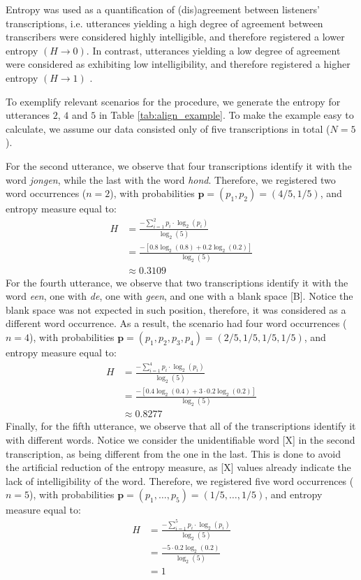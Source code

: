 Entropy was used as a quantification of (dis)agreement between listeners' transcriptions, i.e. utterances yielding a high degree of agreement between transcribers were considered highly intelligible, and therefore registered a lower entropy $\left( H \rightarrow 0 \right)$. In contrast, utterances yielding a low degree of agreement were considered as exhibiting low intelligibility, and therefore registered a higher entropy $\left( H \rightarrow 1 \right)$ \citep{Boonen_et_al_2021, Faes_et_al_2021}. 

To exemplify relevant scenarios for the procedure, we generate the entropy for utterances $2$, $4$ and $5$ in Table \ref{tab:align_example}. To make the example easy to calculate, we assume our data consisted only of five transcriptions in total ($N=5$).

For the second utterance, we observe that four transcriptions identify it with the word \textit{jongen}, while the last with the word \textit{hond}. Therefore, we registered two word occurrences ($n=2$), with probabilities $\pmb{p} = (p_{1}, p_{2}) = (4/5, 1/5)$, and entropy measure equal to:
%
\begin{align*}
	H &= \frac{-\sum_{i=1}^{2} p_{i} \cdot \log_{2}(p_{i})}{\log_{2}(5)} \\
	&= \frac{- \left[ 0.8 \log_{2}(0.8) + 0.2 \log_{2}(0.2) \right] }{\log_{2}(5)} \\
	&\approx 0.3109
\end{align*} 
%
For the fourth utterance, we observe that two transcriptions identify it with the word \textit{een}, one with \textit{de}, one with \textit{geen}, and one with a blank space [B]. Notice the blank space was not expected in such position, therefore, it was considered as a different word occurrence. As a result, the scenario had four word occurrences ($n=4$), with probabilities $\pmb{p} = (p_{1}, p_{2}, p_{3}, p_{4}) = (2/5, 1/5, 1/5, 1/5)$, and entropy measure equal to:
%
\begin{align*}
	H &= \frac{-\sum_{i=1}^{4} p_{i} \cdot \log_{2}(p_{i})}{\log_{2}(5)} \\
	&= \frac{- \left[ 0.4 \log_{2}(0.4) + 3 \cdot 0.2 \log_{2}(0.2) \right] }{\log_{2}(5)} \\
	&\approx 0.8277
\end{align*} 
%
Finally, for the fifth utterance, we observe that all of the  transcriptions identify it with different words. Notice we consider the unidentifiable word [X] in the second transcription, as being different from the one in the last. This is done to avoid the artificial reduction of the entropy measure, as [X] values already indicate the lack of intelligibility of the word. Therefore, we registered five word occurrences ($n=5$), with probabilities $\pmb{p} = (p_{1}, \dots, p_{5}) = (1/5, \dots, 1/5)$, and entropy measure equal to:
%
\begin{align*}
	H &= \frac{-\sum_{i=1}^{5} p_{i} \cdot \log_{2}(p_{i})}{\log_{2}(5)} \\
	&= \frac{- 5 \cdot 0.2 \log_{2}(0.2) }{\log_{2}(5)} \\
	&= 1
\end{align*} 
%
%
